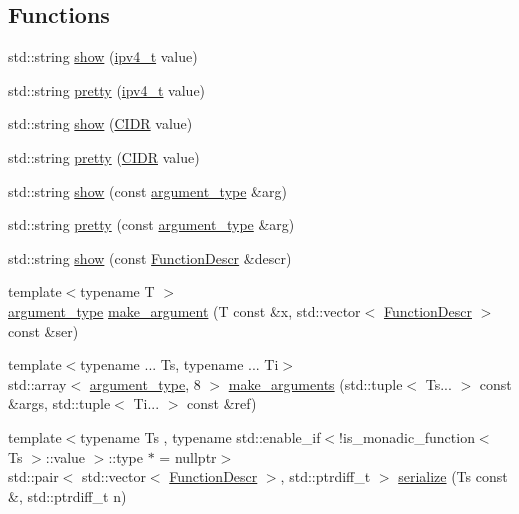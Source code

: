 \subsection*{Functions}
\begin{DoxyCompactItemize}
\item 
std\+::string \hyperlink{namespacepfq_1_1lang_a6b371b706602987f7e45c7558824fa34}{show} (\hyperlink{structpfq_1_1lang_1_1ipv4__t}{ipv4\+\_\+t} value)
\item 
std\+::string \hyperlink{namespacepfq_1_1lang_a7a4c9ec62feae5479366427beeff5b74}{pretty} (\hyperlink{structpfq_1_1lang_1_1ipv4__t}{ipv4\+\_\+t} value)
\item 
std\+::string \hyperlink{namespacepfq_1_1lang_aaa8805ef12da2a39822f13e96197cadd}{show} (\hyperlink{structpfq_1_1lang_1_1CIDR}{C\+I\+DR} value)
\item 
std\+::string \hyperlink{namespacepfq_1_1lang_a980343a34857c5e35e675e8281c0052f}{pretty} (\hyperlink{structpfq_1_1lang_1_1CIDR}{C\+I\+DR} value)
\item 
std\+::string \hyperlink{namespacepfq_1_1lang_a1e54c94175cad1980fc43030d265b58a}{show} (const \hyperlink{structpfq_1_1lang_1_1argument__type}{argument\+\_\+type} \&arg)
\item 
std\+::string \hyperlink{namespacepfq_1_1lang_a2dc4c3535607e668e86aa96674c41eb0}{pretty} (const \hyperlink{structpfq_1_1lang_1_1argument__type}{argument\+\_\+type} \&arg)
\item 
std\+::string \hyperlink{namespacepfq_1_1lang_a7e9458d3c3b90f405ee6df6cbfc43c58}{show} (const \hyperlink{structpfq_1_1lang_1_1FunctionDescr}{Function\+Descr} \&descr)
\item 
{\footnotesize template$<$typename T $>$ }\\\hyperlink{structpfq_1_1lang_1_1argument__type}{argument\+\_\+type} \hyperlink{namespacepfq_1_1lang_ac28f404ec59b7aea311721e0f26b5577}{make\+\_\+argument} (T const \&x, std\+::vector$<$ \hyperlink{structpfq_1_1lang_1_1FunctionDescr}{Function\+Descr} $>$ const \&ser)
\item 
{\footnotesize template$<$typename ... Ts, typename ... Ti$>$ }\\std\+::array$<$ \hyperlink{structpfq_1_1lang_1_1argument__type}{argument\+\_\+type}, 8 $>$ \hyperlink{namespacepfq_1_1lang_aacc9139aafd72e1f19af3a74c1fdc6dc}{make\+\_\+arguments} (std\+::tuple$<$ Ts... $>$ const \&args, std\+::tuple$<$ Ti... $>$ const \&ref)
\item 
{\footnotesize template$<$typename Ts , typename std\+::enable\+\_\+if$<$!is\+\_\+monadic\+\_\+function$<$ Ts $>$\+::value $>$\+::type $\ast$  = nullptr$>$ }\\std\+::pair$<$ std\+::vector$<$ \hyperlink{structpfq_1_1lang_1_1FunctionDescr}{Function\+Descr} $>$, std\+::ptrdiff\+\_\+t $>$ \hyperlink{namespacepfq_1_1lang_ae121f9fc8e23fbd6873d45d02e9adb81}{serialize} (Ts const \&, std\+::ptrdiff\+\_\+t n)

\end{DoxyCompactItemize}
